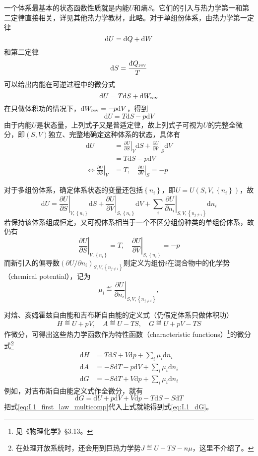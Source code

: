 \documentclass[main.tex]{subfiles}
\begin{document}
一个体系最基本的状态函数性质就是内能$U$和熵$S$。它们的引入与热力学第一和第二定律直接相关，详见其他热力学教材，此略。对于单组份体系，由热力学第一定律
\[\mathrm{d}U=\mathrm{d}\hspace*{-0.08em}\bar{}\hspace*{0.1em} Q+\mathrm{d}\hspace*{-0.08em}\bar{}\hspace*{0.1em} W\]
和第二定律
\[\mathrm{d} S=\frac{\mathrm{d}\hspace*{-0.08em}\bar{}\hspace*{0.1em} Q_\text{rev}}{T}\]
可以给出内能在可逆过程中的微分式
\[\mathrm{d}U=T\mathrm{d}S+\mathrm{d}\hspace*{-0.08em}\bar{}\hspace*{0.1em} W_\text{rev}\]
在只做体积功的情况下，$\mathrm{d}\hspace*{-0.08em}\bar{}\hspace*{0.1em} W_\text{rev}=-p\mathrm{d}V$，得到
\[\mathrm{d}U=T\mathrm{d}S-p\mathrm{d}V\]
由于内能$U$是状态量，上列式子又是普适定律，故上列式子可视为$U$的完整全微分，即$\left(S,V\right)$独立、完整地确定这种体系的状态，具体有
\begin{align*}
    \mathrm{d}U                                                   & =\left.\frac{\partial U}{\partial S}\right|_V\mathrm{d}S+\left.\frac{\partial U}{\partial V}\right|_{S}\mathrm{d}V \\
                                                                  & =T\mathrm{d}S-p\mathrm{d}V                                                                                         \\
    \Leftrightarrow\left.\frac{\partial U}{\partial S}\right|_{V} & =T,\quad\left.\frac{\partial U}{\partial V}\right|_{S}=-p
\end{align*}

对于多组份体系，确定体系状态的变量还包括$\left\{n_i\right\}$，即$U=U\left(S,V,\left\{n_i\right\}\right)$，故
\begin{equation}\label{eq:I.1_first_law_multicomp}
    \mathrm{d}U=\left.\frac{\partial U}{\partial S}\right|_{V,\left\{n_i\right\}}\mathrm{d}S+\left.\frac{\partial U}{\partial V}\right|_{S,\left\{n_i\right\}}\mathrm{d}V+\sum_i\left.\frac{\partial U}{\partial n_i}\right|_{S,V,\left\{n_{j\neq i}\right\}}\mathrm{d}n_i
\end{equation}
若保持该体系组成恒定，又可视体系相当于一个不区分组份种类的单组份体系，故仍有
\[\left.\frac{\partial U}{\partial S}\right|_{V,\left\{n_i\right\}}=T,\quad\left.\frac{\partial U}{\partial V}\right|_{S,\left\{n_i\right\}}=-p\]
而新引入的偏导数$\left(\partial U/\partial n_i\right)_{S,V,\left\{n_{j\neq i}\right\}}$则定义为组份$i$在混合物中的化学势（chemical potential），记为
\[\mu_i\eqdef\left.\frac{\partial U}{\partial n_i}\right|_{S,V,\left\{n_{j\neq i}\right\}},\]

对焓、亥姆霍兹自由能和吉布斯自由能的定义式（仍假定体系只做体积功）
\[H\eqdef U+pV,\quad A\eqdef U-TS,\quad G\eqdef U+pV-TS\]
作微分，可得出这些热力学函数作为特性函数（characteristic functions）\footnote{见《物理化学》\S 3.13。}的微分式\footnote{在处理开放系统时，还会用到巨热力学势$J\eqdef U-TS-n\mu$，这里不介绍了。}
\begin{align}
    \mathrm{d}H & = T\mathrm{d}S+V\mathrm{d}p+\sum_i\mu_i\mathrm{d}n_i\label{eq:I.1_dH} \\
    \mathrm{d}A & =-S\mathrm{d}T-p\mathrm{d}V+\sum_i\mu_i\mathrm{d}n_i\label{eq:I.1_dA} \\
    \mathrm{d}G & =-S\mathrm{d}T+V\mathrm{d}p+\sum_i\mu_i\mathrm{d}n_i\label{eq:I.1_dG}
\end{align}
例如，对吉布斯自由能定义式作全微分，就有
\[\mathrm{d}G=\mathrm{d}U+p\mathrm{d}V+V\mathrm{d}p-T\mathrm{d}S-S\mathrm{d}T\]
把式\eqref{eq:I.1_first_law_multicomp}代入上式就能得到式\eqref{eq:I.1_dG}。
\end{document}
